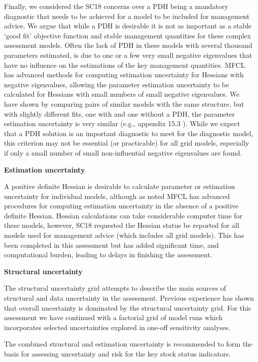 Finally, we considered the SC18 concerns over a PDH being a mandatory diagnostic that needs to be achieved for a model to be included for management advice. We argue that while a PDH is desirable it is not as important as a stable `good fit' objective function and stable management quantities for these complex assessment models. Often the lack of PDH in these models with several thousand parameters estimated, is due to one or a few very small negative eigenvalues that have no influence on the estimations of the key management quantities. MFCL has advanced methods for computing estimation uncertainty for Hessians with negative eigenvalues, allowing the parameter estimation uncertainty to be calculated for Hessians with small numbers of small negative eigenvalues. We have shown by comparing pairs of similar models with the same structure, but with slightly different fits, one with and one without a PDH, the parameter estimation uncertainty is very similar (e.g., appendix 15.3 \citet{castillo_jordan_stock_2022}). While we expect that a PDH solution is an important diagnostic to meet for the diagnostic model, this criterion may not be essential (or practicable) for all grid models, especially if only a small number of small non-influential negative eigenvalues are found.

\textbf{Estimation uncertainty}

A positive definite Hessian is desirable to calculate parameter or estimation uncertainty for individual models, although as noted MFCL has advanced procedures for computing estimation uncertainty in the absence of a positive definite Hessian. Hessian calculations can take considerable computer time for these models, however, SC18 requested the Hessian status be reported for all models used for management advice (which includes all grid models). This has been completed in this assessment but has added significant time, and computational burden, leading to delays in finishing the assessment.

\textbf{Structural uncertainty}

The structural uncertainty grid attempts to describe the main sources of structural and data uncertainty in the assessment. Previous experience has shown that overall uncertainty is dominated by the structural uncertainty grid. For this assessment we have continued with a factorial grid of model runs which incorporates selected uncertainties explored in one-off sensitivity analyses.

The combined structural and estimation uncertainty is recommended to form the basis for assessing uncertainty and risk for the key stock status indicators.

